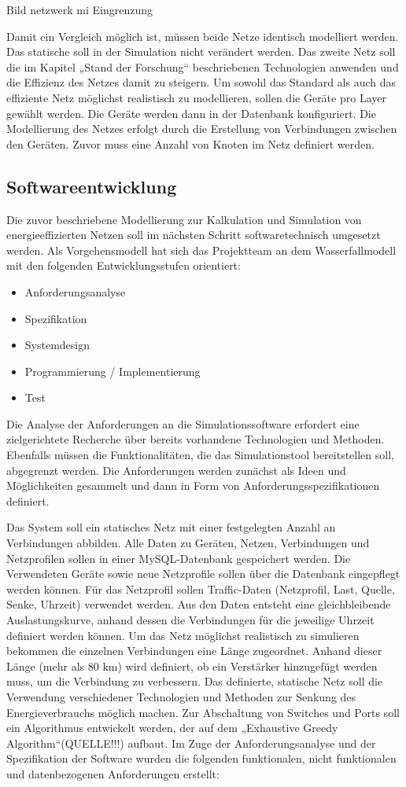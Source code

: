 \documentclass[12pt,titlepage]{article}
\begin{document}
Bild netzwerk mi Eingrenzung


Damit ein Vergleich möglich ist, müssen beide Netze identisch modelliert werden. Das statische soll in der Simulation nicht  verändert werden. Das zweite Netz soll die im Kapitel „Stand der Forschung“ beschriebenen Technologien anwenden und die Effizienz des Netzes damit zu steigern. Um sowohl das Standard als auch das effiziente Netz möglichst realistisch zu modellieren, sollen die Geräte pro Layer gewählt werden. Die Geräte werden dann in der Datenbank konfiguriert. Die Modellierung des Netzes erfolgt durch die Erstellung von Verbindungen zwischen den Geräten. Zuvor muss eine Anzahl von Knoten im Netz definiert werden. 

\subsection{Softwareentwicklung}
Die zuvor beschriebene Modellierung zur Kalkulation und Simulation von energieeffizierten Netzen soll im nächsten Schritt softwaretechnisch umgesetzt werden. Als Vorgehensmodell hat sich das Projektteam an dem Wasserfallmodell mit den folgenden Entwicklungsstufen orientiert:
\begin{itemize}
\item Anforderungsanalyse
\item Spezifikation
\item Systemdesign
\item Programmierung / Implementierung
\item Test
\end{itemize}
Die Analyse der Anforderungen an die Simulationssoftware erfordert eine zielgerichtete Recherche über bereits vorhandene Technologien und Methoden. Ebenfalls müssen die Funktionalitäten, die das Simulationstool bereitstellen soll, abgegrenzt werden. Die Anforderungen werden zunächst als Ideen und Möglichkeiten gesammelt und dann in Form von Anforderungsspezifikationen definiert. 


Das System soll ein statisches Netz mit einer festgelegten Anzahl an Verbindungen abbilden. Alle Daten zu Geräten, Netzen, Verbindungen und Netzprofilen sollen in einer MySQL-Datenbank gespeichert werden. Die Verwendeten Geräte sowie neue Netzprofile sollen über die Datenbank eingepflegt werden können. Für das Netzprofil sollen Traffic-Daten (Netzprofil, Last, Quelle, Senke, Uhrzeit) verwendet werden. Aus den Daten entsteht eine gleichbleibende Auslastungskurve, anhand dessen die Verbindungen für die jeweilige Uhrzeit definiert werden können. Um das Netz möglichst realistisch zu simulieren bekommen die einzelnen Verbindungen eine Länge zugeordnet. Anhand dieser Länge (mehr als 80 km) wird definiert, ob ein Verstärker hinzugefügt werden muss, um die Verbindung zu verbessern. Das definierte, statische Netz soll die Verwendung verschiedener Technologien und Methoden zur Senkung des Energieverbrauchs möglich machen. Zur Abschaltung von Switches und Ports soll ein Algorithmus entwickelt werden, der auf dem „Exhaustive Greedy Algorithm“(QUELLE!!!) aufbaut.
Im Zuge der Anforderungsanalyse und der Spezifikation der Software wurden die folgenden funktionalen, nicht funktionalen und datenbezogenen Anforderungen erstellt:
\end{document}
